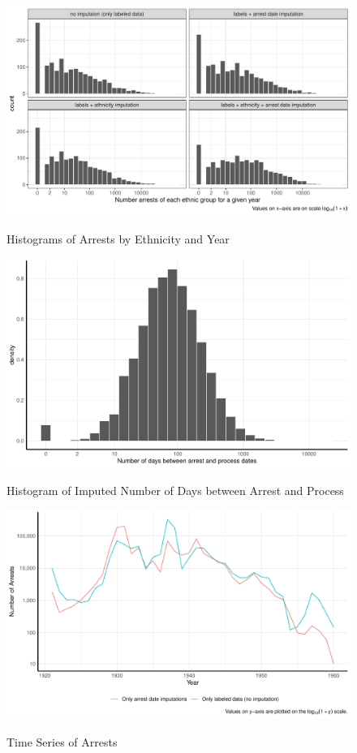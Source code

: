 \begin{figure}[!h]
\centering
\caption{Histograms of Arrests by Ethnicity and Year}
\includegraphics[width=1.2\textwidth]{plots/arrests/facet_hist.pdf}
\label{fig:facet_by_year}
\end{figure}

\begin{figure}[!h]
\centering
\caption{Histogram of Imputed Number of Days between Arrest and Process}
\includegraphics[width=1.2\textwidth]{plots/imputing_arrest_date/mixed_model_preds_hist.pdf}
\label{fig:mixed_model_preds_hist}
\end{figure}
\begin{figure}[!h]
\caption{Time Series of Arrests }
\centering
\includegraphics[width=1.2\textwidth]{plots/arrests/date_imputation_line.pdf}
\label{fig:date_imputation_line}
\end{figure}


